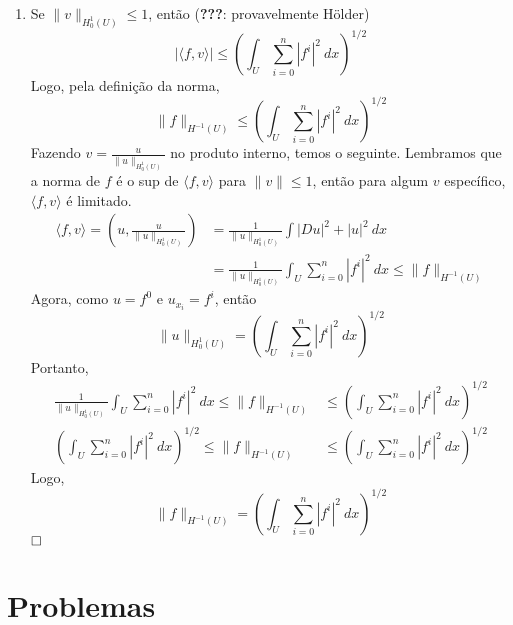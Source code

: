 \documentclass[a4paper, 11pt]{book}
\newcommand{\qed}{$\hfill\square$}
\begin{document}
\begin{enumerate}
	\item Se $\|v\|_{H^1_0(U)}\leq 1$, então (\textbf{???}: provavelmente Hölder)\[
	| \langle f, v \rangle | \leq \left( \int_{U} \sum_{i=0}^{n} |f^i|^2 \ dx  \right)^{1/2}	
	\]
	Logo, pela definição da norma, \[
	\|f\|_{H^{-1}(U)} \leq \left( \int_U \sum_{i=0}^{n} |f^i|^2 \ dx \right)^{1/2}	
	\]
	Fazendo $v = \frac{u}{\|u\|_{H^1_0(U)}}$ no produto interno, temos o seguinte. Lembramos que a norma de $f$ é o sup de $\langle f, v \rangle$ para $\|v\|\leq 1$, então para algum $v$ específico, $\langle f, v \rangle$ é limitado.
	\begin{align*}
		\langle f, v \rangle = \left( u, \tfrac{u}{\|u\|_{H^1_0(U)}} \right) &= \frac{1}{\|u\|_{H^1_0(U)}}\int |Du|^2 + |u|^2 \ dx \\
		 &= \frac{1}{\|u\|_{H^1_0(U)}}\int_{U} \sum_{i=0}^{n} |f^i|^2 \ dx \leq \|f\|_{H^{-1}(U)}
	\end{align*}
	Agora, como $u=f^0$ e $u_{x_i}=f^i$, então
	\[
	\|u\|_{H^1_0(U)} = \left( \int_U \sum_{i=0}^{n} |f^i|^2 \ dx \right)^{1/2} 	
	\]
	Portanto,
	\begin{align*}
		\frac{1}{\|u\|_{H^1_0(U)}}\int_{U} \sum_{i=0}^{n} |f^i|^2 \ dx \leq \|f\|_{H^{-1}(U)} &\leq \left( \int_U \sum_{i=0}^{n} |f^i|^2 \ dx\right)^{1/2} \\
		\left( \int_U \sum_{i=0}^{n} |f^i|^2 \ dx\right)^{1/2} \leq \|f\|_{H^{-1}(U)} &\leq \left( \int_U \sum_{i=0}^{n} |f^i|^2 \ dx\right)^{1/2}
	\end{align*}
	Logo, \[\|f\|_{H^{-1}(U)} = \left( \int_U \sum_{i=0}^{n} |f^i|^2 \ dx\right)^{1/2}\]
	\qed


\end{enumerate}

\section{Problemas}
\end{document}
